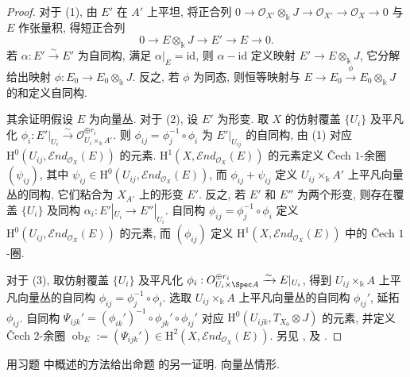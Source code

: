 \begin{proof}
对于 (1), 由 $E'$ 在 $A'$ 上平坦, 将正合列 $0\to\mathcal O_{X'}\otimes_{\Bbbk}J\to\mathcal O_{X'}\to\mathcal O_X\to0$ 与 $E$ 作张量积, 得短正合列
\[
0\to E\otimes_{\Bbbk}J\to E'\to E\to0.
\]
若 $\alpha:E'\xrightarrow{\sim}E'$ 为自同构, 满足 $\alpha|_E=\mathrm{id}$, 则 $\alpha-\mathrm{id}$ 定义映射 $E'\to E\otimes_{\Bbbk}J$, 它分解给出映射 $\phi:E_0\to E_0\otimes_{\Bbbk}J$. 反之, 若 $\phi$ 为同态, 则恒等映射与 $E\to E_0\xrightarrow{\phi}E_0\otimes_{\Bbbk}J$ 的和定义自同构.

其余证明假设 $E$ 为向量丛. 对于 (2), 设 $E'$ 为形变. 取 $X$ 的仿射覆盖 $\{U_i\}$ 及平凡化 $\phi_i:E'|_{U_i}\xrightarrow{\sim}\mathcal O_{U_i\times_{\Bbbk}A'}^{\oplus r_i}$. 则 $\phi_{ij}=\phi_j^{-1}\circ\phi_i$ 为 $E'|_{U_{ij}}$ 的自同构, 由 (1) 对应 $\mathrm H^0(U_{ij},\mathcal End_{\mathcal O_X}(E))$ 的元素. $\mathrm H^1(X,\mathcal End_{\mathcal O_X}(E))$ 的元素定义 Čech $1$-余圈 $(\psi_{ij})$, 其中 $\psi_{ij}\in\mathrm H^0(U_{ij},\mathcal End_{\mathcal O_X}(E))$, 而 $\phi_{ij}+\psi_{ij}$ 定义 $U_{ij}\times_{\Bbbk}A'$ 上平凡向量丛的同构, 它们粘合为 $X_{A'}$ 上的形变 $E'$. 反之, 若 $E'$ 和 $E''$ 为两个形变, 则存在覆盖 $\{U_i\}$ 及同构 $\alpha_i:E'|_{U_i}\to E''|_{U_i}$. 自同构 $\phi_{ij}=\phi_j^{-1}\circ\phi_i$ 定义 $\mathrm H^0(U_{ij},\mathcal End_{\mathcal O_X}(E))$ 的元素, 而 $(\phi_{ij})$ 定义 $\mathrm H^1(X,\mathcal End_{\mathcal O_X}(E))$ 中的 Čech $1$-圈.

对于 (3), 取仿射覆盖 $\{U_i\}$ 及平凡化 $\phi_i:\mathcal O_{U_i\times\Spec A}^{\oplus r_i}\xrightarrow{\sim}E|_{U_i}$, 得到 $U_{ij}\times_{\Bbbk}A$ 上平凡向量丛的自同构 $\phi_{ij}=\phi_j^{-1}\circ\phi_i$. 选取 $U_{ij}\times_{\Bbbk}A$ 上平凡向量丛的自同构 $\phi_{ij}'$, 延拓 $\phi_{ij}$. 自同构 $\Psi_{ijk}'=(\phi_{ik}')^{-1}\circ\phi_{jk}'\circ\phi_{ij}'$ 对应 $\mathrm H^0(U_{ijk},T_{X_0}\otimes J)$ 的元素, 并定义 Čech $2$-余圈 $\operatorname{ob}_E:=(\Psi_{ijk}')\in\mathrm H^2(X,\mathcal End_{\mathcal O_X}(E))$. 另见 \cite[定理 $7.1$]{Har10}, \cite[\S $2$.A.$6$]{HL10} 及 \cite[Tag 08VW]{SP}.
\end{proof}
\begin{exercise}\label{src:C.2.13}
用习题  中概述的方法给出命题  的另一证明. 向量丛情形.
\end{exercise}
